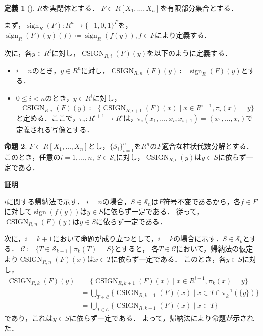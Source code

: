 \documentclass[uplatex, dvipdfmx]{jsarticle}
\makeatletter
\numberwithin{equation}{section}
\renewenvironment{proof}[1][\proofname]{\par
  \pushQED{\qed}%
  \normalfont \topsep6\p@\@plus6\p@\relax
  \trivlist
  \item\relax
  {\bfseries
  #1\@addpunct{.}}\hspace\labelsep\ignorespaces
}{
  \popQED\endtrivlist\@endpefalse
}
\newcommand{\map}[3]{{#1}\colon{#2}\rightarrow{#3}}
\DeclareMathOperator{\sign}{sign}
\DeclareMathOperator{\CSIGN}{CSIGN}
\theoremstyle{definition}
\newtheorem{definition}{定義}[section]
\newtheorem{proposition}[definition]{命題}
\renewcommand{\proofname}{\textbf{証明}}
\makeatother
\begin{document}
\begin{definition}[{\cite[Notation 11.7]{MR2248869}}]
     $R$を実閉体とする．
     $F \subset R[X_1, \dots, X_n]$を有限部分集合とする．

     まず，$\map{\sign_R(F)}{R^n}{\{-1, 0, 1\}^F}$を，
     $\sign_R(F)(y)(f)\coloneqq \sign_R(f(y)), f \in F$により定義する．

     次に，各$y \in R^i$に対し，$\CSIGN_{R,i}(F)(y)$を以下のように定義する．
     \begin{itemize}
          \item $i=n$のとき，$y \in R^n$に対し，$\CSIGN_{R,n}(F)(y)\coloneqq \sign_R(F)(y) $とする．
          \item $0 \leq i<n$のとき，$y \in R^i$に対し，
          \begin{equation}
               \CSIGN_{R,i}(F)(y) \coloneqq \{\CSIGN_{R,i+1}(F)(x) \mid x \in  R^{i+1}, \pi_i(x) = y\}
          \end{equation}
          と定める．ここで，$\map{\pi_i}{R^{i+1}}{R^i}$は，$\pi_i(x_1, \dots, x_i, x_{i+1}) = (x_1, \dots, x_i)$で定義される写像とする．
     \end{itemize}
\end{definition}

\begin{proposition} \label{proposition:independence-of-CSIGN}
     $F \subset R[X_1, \dots, X_n]$とし，$\{\mathcal{S}_i\}_{i=1}^n$を$R^n$の$F$適合な柱状代数分解とする．
     このとき，任意の$i=1, \dots, n$, $S \in \mathcal{S}_i$に対し，$\CSIGN_{R,i}(y)$は$y \in S$に依らず一定である．
\end{proposition}

\begin{proof}
     $i$に関する帰納法で示す．
     $i=n$の場合，$S \in \mathcal{S}_n$は$F$符号不変であるから，各$f \in F$に対して$\sign(f(y))$は$y \in S$に依らず一定である．
     従って，$\CSIGN_{R,n}(F)(y)$は$y \in S$に依らず一定である．

     次に，$i=k+1$において命題が成り立つとして，$i=k$の場合に示す．$S \in \mathcal{S}_k$とする．
     $\mathcal{C} \coloneqq \{T \in \mathcal{S}_{k+1} \mid \pi_{k}(T) = S\}$とすると，
     各$T \in \mathcal{C}$において，帰納法の仮定より$\CSIGN_{R,n}(F)(x)$は$x \in T$に依らず一定である．
     このとき，各$y \in S$に対し，
     \begin{align}
          \CSIGN_{R,k}(F)(y)
          &= \{\CSIGN_{R,k+1}(F)(x) \mid x \in R^{i+1}, \pi_{k}(x) = y\}\\
          &= \bigcup_{T \in \mathcal{C}}\{\CSIGN_{R,k+1}(F)(x) \mid x \in T \cap \pi_k^{-1}(\{y\})\}\\
          &= \bigcup_{T \in \mathcal{C}}\{\CSIGN_{R,k+1}(F)(x) \mid x \in T\}
     \end{align}
     であり，これは$y \in S$に依らず一定である．
     よって，帰納法により命題が示された．
\end{proof}
\end{document}
